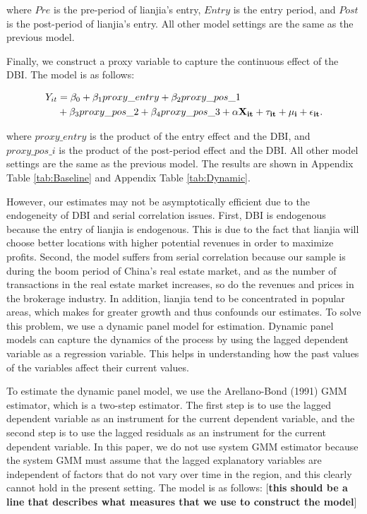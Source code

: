 where $Pre$ is the pre-period of lianjia's entry, $Entry$ is the entry period, and $Post$ is the post-period of lianjia's entry. All other model settings are the same as the previous model.

Finally, we construct a proxy variable to capture the continuous effect of the DBI. The model is as follows:

\begin{equation}
  \begin{aligned}
    Y_{it} & = \beta_0 + \beta_1 proxy\_entry + \beta_2 proxy\_pos\_1 \\
    & + \beta_3 proxy\_pos\_2 + \beta_4 proxy\_pos\_3 + \bf{\alpha} \bf{X}_{it} + \tau_{it} + \mu_i + \epsilon_{it}.
  \end{aligned}
\end{equation}

where $proxy\_entry$ is the product of the entry effect and the DBI, and $proxy\_pos\_i$ is the product of the post-period effect and the DBI. All other model settings are the same as the previous model. The results are shown in Appendix Table \ref{tab:Baseline} and Appendix Table \ref{tab:Dynamic}.

However, our estimates may not be asymptotically efficient due to the endogeneity of DBI and serial correlation issues. First, DBI is endogenous because the entry of lianjia is endogenous. This is due to the fact that lianjia will choose better locations with higher potential revenues in order to maximize profits. Second, the model suffers from serial correlation because our sample is during the boom period of China's real estate market, and as the number of transactions in the real estate market increases, so do the revenues and prices in the brokerage industry. In addition, lianjia tend to be concentrated in popular areas, which makes for greater growth and thus confounds our estimates. To solve this problem, we use a dynamic panel model for estimation. Dynamic panel models can capture the dynamics of the process by using the lagged dependent variable as a regression variable. This helps in understanding how the past values of the variables affect their current values. 

To estimate the dynamic panel model, we use the Arellano-Bond (1991) GMM estimator, which is a two-step estimator. The first step is to use the lagged dependent variable as an instrument for the current dependent variable, and the second step is to use the lagged residuals as an instrument for the current dependent variable. In this paper, we do not use system GMM estimator because the system GMM must assume that the lagged explanatory variables are independent of factors that do not vary over time in the region, and this clearly cannot hold in the present setting. The model is as follows: [\textbf{this should be a line that describes what measures that we use to construct the model}]

